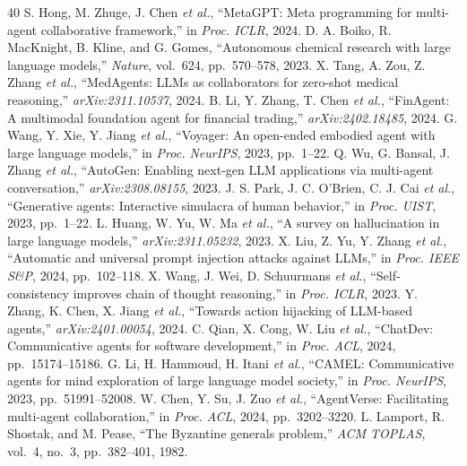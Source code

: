 \documentclass[journal,10pt]{IEEEtran}
\begin{document}
\begin{thebibliography}{40}
 S. Hong, M. Zhuge, J. Chen \emph{et al.}, ``MetaGPT: Meta programming for multi-agent collaborative framework,'' in \emph{Proc. ICLR}, 2024.
 D. A. Boiko, R. MacKnight, B. Kline, and G. Gomes, ``Autonomous chemical research with large language models,'' \emph{Nature}, vol.~624, pp.\ 570--578, 2023.
 X. Tang, A. Zou, Z. Zhang \emph{et al.}, ``MedAgents: LLMs as collaborators for zero-shot medical reasoning,'' \emph{arXiv:2311.10537}, 2024.
 B. Li, Y. Zhang, T. Chen \emph{et al.}, ``FinAgent: A multimodal foundation agent for financial trading,'' \emph{arXiv:2402.18485}, 2024.
 G. Wang, Y. Xie, Y. Jiang \emph{et al.}, ``Voyager: An open-ended embodied agent with large language models,'' in \emph{Proc. NeurIPS}, 2023, pp.\ 1--22.
 Q. Wu, G. Bansal, J. Zhang \emph{et al.}, ``AutoGen: Enabling next-gen LLM applications via multi-agent conversation,'' \emph{arXiv:2308.08155}, 2023.
 J. S. Park, J. C. O'Brien, C. J. Cai \emph{et al.}, ``Generative agents: Interactive simulacra of human behavior,'' in \emph{Proc. UIST}, 2023, pp.\ 1--22.
 L. Huang, W. Yu, W. Ma \emph{et al.}, ``A survey on hallucination in large language models,'' \emph{arXiv:2311.05232}, 2023.
 X. Liu, Z. Yu, Y. Zhang \emph{et al.}, ``Automatic and universal prompt injection attacks against LLMs,'' in \emph{Proc. IEEE S\&P}, 2024, pp.\ 102--118.
 X. Wang, J. Wei, D. Schuurmans \emph{et al.}, ``Self-consistency improves chain of thought reasoning,'' in \emph{Proc. ICLR}, 2023.
 Y. Zhang, K. Chen, X. Jiang \emph{et al.}, ``Towards action hijacking of LLM-based agents,'' \emph{arXiv:2401.00054}, 2024.
 C. Qian, X. Cong, W. Liu \emph{et al.}, ``ChatDev: Communicative agents for software development,'' in \emph{Proc. ACL}, 2024, pp.\ 15174--15186.
 G. Li, H. Hammoud, H. Itani \emph{et al.}, ``CAMEL: Communicative agents for mind exploration of large language model society,'' in \emph{Proc. NeurIPS}, 2023, pp.\ 51991--52008.
 W. Chen, Y. Su, J. Zuo \emph{et al.}, ``AgentVerse: Facilitating multi-agent collaboration,'' in \emph{Proc. ACL}, 2024, pp.\ 3202--3220.
 L. Lamport, R. Shostak, and M. Pease, ``The Byzantine generals problem,'' \emph{ACM TOPLAS}, vol.~4, no.~3, pp.\ 382--401, 1982.

\end{thebibliography}
\end{document}
